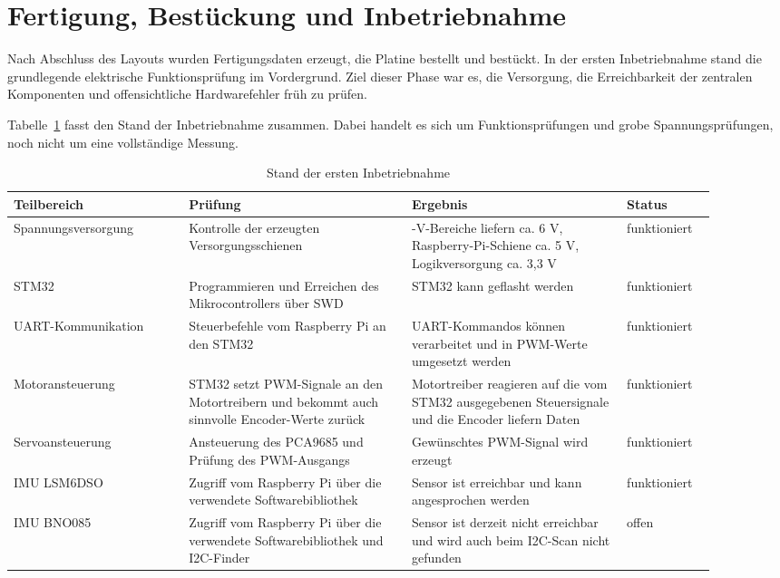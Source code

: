 \section{Fertigung, Bestückung und Inbetriebnahme}
Nach Abschluss des Layouts wurden Fertigungsdaten erzeugt, die Platine bestellt und bestückt. In der ersten Inbetriebnahme stand die grundlegende elektrische Funktionsprüfung im Vordergrund. Ziel dieser Phase war es, die Versorgung, die Erreichbarkeit der zentralen Komponenten und offensichtliche Hardwarefehler früh zu prüfen.

Tabelle~\ref{tab:inbetriebnahme} fasst den Stand der Inbetriebnahme zusammen. Dabei handelt es sich um Funktionsprüfungen und grobe Spannungsprüfungen, noch nicht um eine vollständige Messung.

\begin{table}[H]
	\centering
	\small
	\renewcommand{\arraystretch}{1.35}
	\begin{tabularx}{\linewidth}{|>{\RaggedRight\arraybackslash}m{0.22\linewidth}|>{\RaggedRight\arraybackslash}m{0.29\linewidth}|>{\RaggedRight\arraybackslash}m{0.27\linewidth}|>{\RaggedRight\arraybackslash}m{0.119\linewidth}|}
		\hline
		\textbf{Teilbereich} & \textbf{Prüfung} & \textbf{Ergebnis} & \textbf{Status} \\\hline
		Spannungsversorgung & Kontrolle der erzeugten Versorgungsschienen & 6-V-Bereiche liefern ca. 6 V, Raspberry-Pi-Schiene ca. 5 V, Logikversorgung ca. 3,3 V & funktioniert \\\hline
		STM32 & Programmieren und Erreichen des Mikrocontrollers über SWD & STM32 kann geflasht werden & funktioniert \\\hline
		UART-Kommunikation & Steuerbefehle vom Raspberry Pi an den STM32 & UART-Kommandos können verarbeitet und in PWM-Werte umgesetzt werden & funktioniert \\\hline
		Motoransteuerung & STM32 setzt PWM-Signale an den Motortreibern und bekommt auch sinnvolle Encoder-Werte zurück & Motortreiber reagieren auf die vom STM32 ausgegebenen Steuersignale und die Encoder liefern Daten & funktioniert \\\hline
		Servoansteuerung & Ansteuerung des PCA9685 und Prüfung des PWM-Ausgangs & Gewünschtes PWM-Signal wird erzeugt & funktioniert \\\hline
		IMU LSM6DSO & Zugriff vom Raspberry Pi über die verwendete Softwarebibliothek & Sensor ist erreichbar und kann angesprochen werden & funktioniert \\\hline
		IMU BNO085 & Zugriff vom Raspberry Pi über die verwendete Softwarebibliothek und I2C-Finder & Sensor ist derzeit nicht erreichbar und wird auch beim I2C-Scan nicht gefunden & offen \\\hline
	\end{tabularx}
	\caption{Stand der ersten Inbetriebnahme}
	\label{tab:inbetriebnahme}
\end{table}

